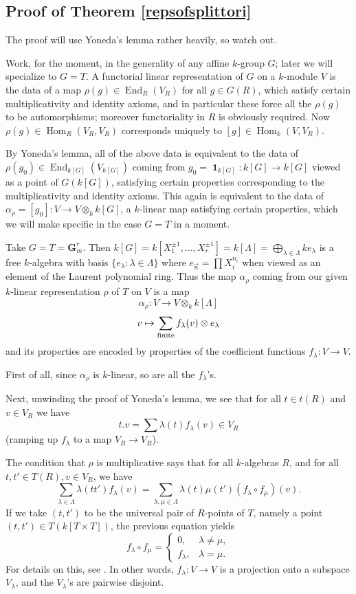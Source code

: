 \documentclass[10pt]{article}
\newcommand{\Hom}{\operatorname{Hom}}
\renewcommand{\(}{\left(}
\renewcommand{\)}{\right)}
\newcommand{\End}{\operatorname{End}}
\DeclareMathOperator{\id}{\mathbf{1}}
\newcommand{\dotimes}{\displaystyle\mathop{\otimes}}
\numberwithin{thm}{subsection}
\begin{document}
\subsection{Proof of Theorem \ref{repsofsplittori}}
The proof will use Yoneda's lemma rather heavily, so watch out.

Work, for the moment, in the generality of any affine $k$-group $G$;
later we will specialize to $G=T$.
A functorial linear representation of $G$ on a $k$-module $V$
is the data of a map $\rho(g)\in \End_R(V_R)$
for all $g\in G(R)$,
which satisfy certain multiplicativity and identity axioms,
and in particular these force all the $\rho(g)$ to be automorphisms;
moreover functoriality in $R$ is obviously required.
Now $\rho(g)\in \Hom_R(V_R,V_R)$ corresponds uniquely
to $[g]\in \Hom_k(V,V_R)$.

By Yoneda's lemma, all of the above data is equivalent to the data
of $\rho(g_0)\in \End_{k[G]}(V_{k[G]})$
coming from $g_0=\id_{k[G]}:k[G]\to k[G]$
viewed as a point of $G(k[G])$, satisfying certain properties corresponding to the multiplicativity and identity axioms.
This again is equivalent to the data of
 $\alpha_\rho=[g_0]:V\to V\dotimes_k k[G]$,
a $k$-linear map satisfying certain properties, which we will make specific
in the case $G=T$ in a moment.

Take $G=T=\mathbf{G}_m^r$.
Then $k[G]=k[X_1^{\pm 1},\ldots, X_r^{\pm 1}]=k[\Lambda]
=\bigoplus_{\lambda\in \Lambda} ke_\lambda$
is a free $k$-algebra with basis $\{e_\lambda:\lambda\in \Lambda\}$
where $e_{\vec n}=\prod X_i^{n_i}$ when viewed as an element of the Laurent polynomial ring.
Thus the map $\alpha_\rho$ coming from our given
$k$-linear representation $\rho$ of $T$ on $V$
is a map
\[\alpha_\rho:V\to V\dotimes_k k[\Lambda]\]
\[v\mapsto\sum_{\rm{finite}}f_\lambda(v)\otimes e_\lambda\]
and its properties are encoded by properties of the coefficient functions
$f_\lambda:V\to V$.

First of all, since $\alpha_\rho$ is $k$-linear, so are all the $f_\lambda$'s.

Next, unwinding the proof of Yoneda's lemma, we see
that for all $t\in t(R)$ and $v\in V_R$
we have
\begin{equation*}\label{toruseq}\tag{$\dagger$}t.v=\sum \lambda(t) f_\lambda(v)\in V_R\end{equation*}
(ramping up $f_\lambda$ to a map $V_R\to V_R$).

The condition that $\rho$ is multiplicative says that for all $k$-algebras $R$,
and for all $t,t'\in T(R), v\in V_R$, we have
\[\sum_{\lambda\in\Lambda} \lambda(tt')f_\lambda(v)=\sum_{\lambda,\mu\in \Lambda}\lambda(t)\mu(t')(f_\lambda\circ f_\mu)(v).\]
If we take $(t,t')$ to be the universal pair of $R$-points
of $T$,
namely a point $(t,t')\in T(k[T\times T])$, the previous equation yields
\[f_\lambda\circ f_\mu=\begin{cases}0,&\lambda\neq \mu,\\
f_\lambda,&\lambda=\mu.\end{cases}\]
For details on this, see \cite[A.8.8]{pred}. 
In other words, $f_\lambda:V\to V$ is a projection onto a subspace
$V_\lambda$, and the $V_\lambda$'s are pairwise disjoint.
\end{document}
